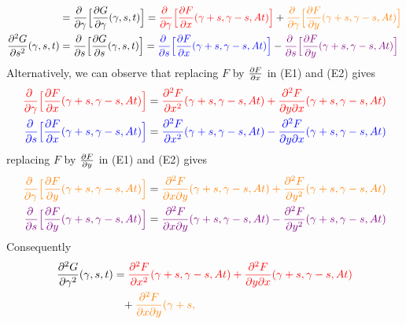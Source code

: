 \begin{solution}
\begin{align*}
&=\pdiff{}{\ga}\Big[\pdiff{G}{\ga}(\ga, s, t)\Big]
=\textcolor{red}{\pdiff{}{\ga}\Big[\pdiff{F}{x}(\gamma + s, \gamma-s, At)\Big]}
+\textcolor{orange}{\pdiff{}{\ga}\Big[\pdiff{F}{y}(\gamma + s, \gamma-s, At) 
                                                                   \Big]}
\\
\frac{\partial^2G}{\partial s^2}(\ga,s,t)
&=\pdiff{}{s}\Big[\pdiff{G}{s}(\ga, s, t)\Big]
=\textcolor{blue}{\pdiff{}{s}\Big[\pdiff{F}{x}(\gamma + s, \gamma-s, At)\Big]}
  -\textcolor{violet}{\pdiff{}{s}\Big[\pdiff{F}{y}(\gamma + s, \gamma-s, At)
                                                            \Big]}
\end{align*}
Alternatively, we can observe that replacing $F$ by $\pdiff{F}{x}$ in
(E1) and (E2) gives
\begin{align*}
\textcolor{red}{\pdiff{}{\ga}\Big[\pdiff{F}{x}(\gamma + s, \gamma-s, At)\Big]}
&=\textcolor{red}{\frac{\partial^2 F}{\partial x^2}(\gamma + s, \gamma-s, At)
  +\frac{\partial^2 F}{\partial y\partial x}(\gamma + s,  \gamma-s, At)}
\\
\textcolor{blue}{\pdiff{}{s}\Big[\pdiff{F}{x}(\gamma + s, \gamma-s, At) \Big]}
&=\textcolor{blue}{\frac{\partial^2 F}{\partial x^2}(\gamma + s, \gamma-s, At)
         -\frac{\partial^2 F}{\partial y\partial x}(\gamma + s, \gamma-s, At)}
\end{align*}
replacing $F$ by $\pdiff{F}{y}$ in
(E1) and (E2) gives
\begin{align*}
\textcolor{orange}{\pdiff{}{\ga}\Big[\pdiff{F}{y}(\gamma + s, \gamma-s,At)\Big]}
&=\textcolor{orange}{\frac{\partial^2 F}{\partial x\partial y}(\gamma + s, 
                                                                \gamma-s, At)
 +\frac{\partial^2 F}{\partial y^2}(\gamma + s, \gamma-s,At)}
\\
\textcolor{violet}{\pdiff{}{s}\Big[\pdiff{F}{y}(\gamma + s, \gamma-s, At) \Big]}
&=\textcolor{violet}{\frac{\partial^2 F}{\partial x\partial y}(\gamma + s, 
                                                                 \gamma-s, At)
         -\frac{\partial^2 F}{\partial y^2}(\gamma + s, \gamma-s, At)}
\end{align*}
Consequently
\begin{align*}
\frac{\partial^2G}{\partial\gamma^2}(\gamma,s,t) 
 &=  \textcolor{red}{\frac{\partial^2 F}{\partial x^2}(\gamma + s, \gamma-s, At)
   +\frac{\partial^2 F}{\partial y\partial x}(\gamma + s,  \gamma-s, At)} \\
                 &\phantom{=}+ 
 \textcolor{orange}{\frac{\partial^2 F}{\partial x\partial y}(\gamma + s, 
}
\end{align*}
\end{solution}
